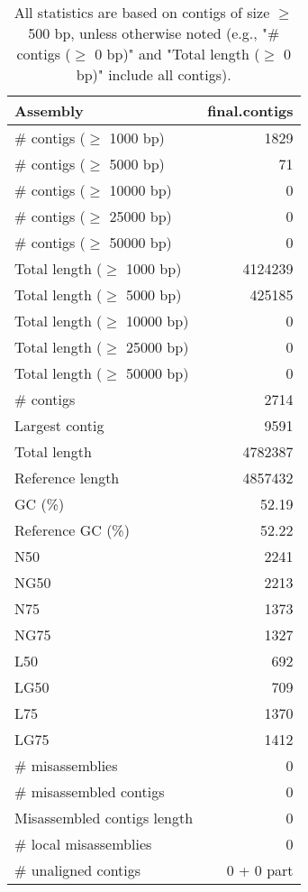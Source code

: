 \documentclass[12pt,a4paper]{article}
\begin{document}
\begin{table}[ht]
\begin{center}
\caption{All statistics are based on contigs of size $\geq$ 500 bp, unless otherwise noted (e.g., "\# contigs ($\geq$ 0 bp)" and "Total length ($\geq$ 0 bp)" include all contigs).}
\begin{tabular}{|l*{1}{|r}|}
\hline
Assembly & final.contigs \\ \hline
\# contigs ($\geq$ 1000 bp) & 1829 \\ \hline
\# contigs ($\geq$ 5000 bp) & 71 \\ \hline
\# contigs ($\geq$ 10000 bp) & 0 \\ \hline
\# contigs ($\geq$ 25000 bp) & 0 \\ \hline
\# contigs ($\geq$ 50000 bp) & 0 \\ \hline
Total length ($\geq$ 1000 bp) & 4124239 \\ \hline
Total length ($\geq$ 5000 bp) & 425185 \\ \hline
Total length ($\geq$ 10000 bp) & 0 \\ \hline
Total length ($\geq$ 25000 bp) & 0 \\ \hline
Total length ($\geq$ 50000 bp) & 0 \\ \hline
\# contigs & 2714 \\ \hline
Largest contig & 9591 \\ \hline
Total length & 4782387 \\ \hline
Reference length & 4857432 \\ \hline
GC (\%) & 52.19 \\ \hline
Reference GC (\%) & 52.22 \\ \hline
N50 & 2241 \\ \hline
NG50 & 2213 \\ \hline
N75 & 1373 \\ \hline
NG75 & 1327 \\ \hline
L50 & 692 \\ \hline
LG50 & 709 \\ \hline
L75 & 1370 \\ \hline
LG75 & 1412 \\ \hline
\# misassemblies & 0 \\ \hline
\# misassembled contigs & 0 \\ \hline
Misassembled contigs length & 0 \\ \hline
\# local misassemblies & 0 \\ \hline
\# unaligned contigs & 0 + 0 part \\ \hline

\end{tabular}
\end{center}
\end{table}
\end{document}

